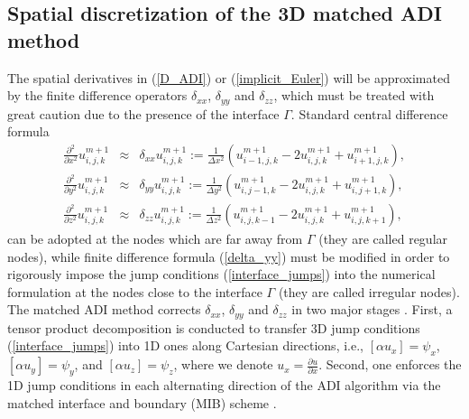 \documentclass[dissertation]{uathesis}
\begin{document}
\begin{body}
\section{Spatial discretization of the 3D matched ADI method}
The spatial derivatives in (\ref{D_ADI}) or (\ref{implicit_Euler}) will be approximated by the finite difference operators $\delta_{xx}$, $\delta_{yy}$ and $\delta_{zz}$, which must be treated with great caution due to the presence of the interface $\Gamma$. Standard central difference formula 
%
\begin{eqnarray} \label{delta_yy}
\frac{\partial^2}{\partial x^2}u^{m+1}_{i,j,k} & \approx &
\delta_{xx} u^{m+1}_{i,j,k} := \frac{1}{\Delta x^{2}} (u^{m+1}_{i-1,j,k} - 2 u^{m+1}_{i,j,k} + u^{m+1}_{i+1,j,k}), \nonumber \\
\frac{\partial^2}{\partial y^2}u^{m+1}_{i,j,k}& \approx &
\delta_{yy} u^{m+1}_{i,j,k} := \frac{1}{\Delta y^{2}} (u^{m+1}_{i,j-1,k} - 2 u^{m+1}_{i,j,k} + u^{m+1}_{i,j+1,k}), \\
\frac{\partial^2}{\partial z^2}u^{m+1}_{i,j,k} & \approx &
\delta_{zz} u^{m+1}_{i,j,k} := \frac{1}{\Delta z^{2}} (u^{m+1}_{i,j,k-1} - 2 u^{m+1}_{i,j,k} + u^{m+1}_{i,j,k+1}),	\nonumber
\end{eqnarray}
%
can be adopted at the nodes which are far away from $\Gamma$ (they are called regular nodes), while finite difference formula (\ref{delta_yy}) must be modified in order to rigorously impose the jump conditions (\ref{interface_jumps}) into the numerical formulation at the nodes close to the interface $\Gamma$ (they are called irregular nodes). 
The matched ADI method corrects $\delta_{xx}$, $\delta_{yy}$ and $\delta_{zz}$ in two major stages \cite{zhao2015matched,li2017matched}. 
First, a tensor product decomposition is conducted to transfer 3D jump conditions (\ref{interface_jumps}) into 1D ones along Cartesian directions, i.e.,
$[\alpha u_x]=\psi_x$,  $[\alpha u_y]=\psi_y$, and  $[\alpha u_z]=\psi_z$, 
where we denote $u_{x} = \frac{\partial u}{\partial x}$.
Second, one enforces the 1D jump conditions in each alternating direction of the ADI algorithm via the matched interface and boundary (MIB) scheme  \cite{zhao2004high, zhou2006high,yu2007three,yu2007matched}.



\end{body}
\end{document}

